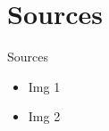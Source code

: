     \section{Sources}

    \begin{frame}[t,fragile]{Sources}
        \begin{itemize}
            \item Img 1
            \item Img 2
        \end{itemize}
    \end{frame}



